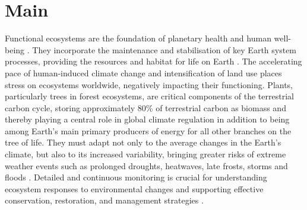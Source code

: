 \documentclass[pdflatex,sn-mathphys-num]{sn-jnl}%
\theoremstyle{thmstyleone}%
\theoremstyle{thmstyletwo}%
\theoremstyle{thmstylethree}%
\begin{document}
\maketitle

\section{Main}\label{sec1}

Functional ecosystems are the foundation of planetary health and human well-being \cite{ipbes2019,hernandez2022ecosystem}. They incorporate the maintenance and stabilisation of key Earth system processes, providing the resources and habitat for life on Earth \cite{ipcc2022wg2ch2}. The accelerating pace of human-induced climate change and intensification of land use places stress on ecosystems worldwide, negatively impacting their functioning. Plants, particularly trees in forest ecosystems, are critical components of the terrestrial carbon cycle, storing approximately 80\% of terrestrial carbon as biomass and thereby playing a central role in global climate regulation \cite{pan2011large} in addition to being among Earth's main primary producers of energy for all other branches on the tree of life. They must adapt not only to the average changes in the Earth's climate, but also to its increased variability, bringing greater risks of extreme weather events such as prolonged droughts, heatwaves, late frosts, storms and floods \cite{lindner2010climate,seidl2017}. Detailed and continuous monitoring is crucial for understanding ecosystem responses to environmental changes and supporting effective conservation, restoration, and management strategies \cite{mahecha2024biodiversity}.
\end{document}
